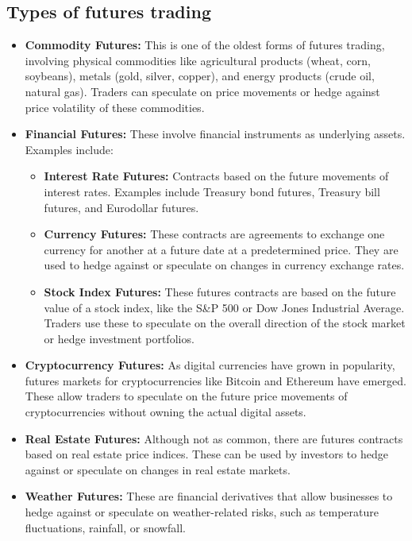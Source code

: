 \documentclass{report}
\begin{document}
    \bigbreak \noindent 
    \subsection{Types of futures trading}
    \bigbreak \noindent 
    \begin{itemize}
        \item \textbf{Commodity Futures:} This is one of the oldest forms of futures trading, involving physical commodities like agricultural products (wheat, corn, soybeans), metals (gold, silver, copper), and energy products (crude oil, natural gas). Traders can speculate on price movements or hedge against price volatility of these commodities.
        \item \textbf{Financial Futures:} These involve financial instruments as underlying assets. Examples include:
            \begin{itemize}
                \item \textbf{Interest Rate Futures:} Contracts based on the future movements of interest rates. Examples include Treasury bond futures, Treasury bill futures, and Eurodollar futures.
                \item \textbf{Currency Futures:} These contracts are agreements to exchange one currency for another at a future date at a predetermined price. They are used to hedge against or speculate on changes in currency exchange rates.
                \item \textbf{Stock Index Futures:} These futures contracts are based on the future value of a stock index, like the S&P 500 or Dow Jones Industrial Average. Traders use these to speculate on the overall direction of the stock market or hedge investment portfolios.
            \end{itemize}
        \item \textbf{Cryptocurrency Futures:} As digital currencies have grown in popularity, futures markets for cryptocurrencies like Bitcoin and Ethereum have emerged. These allow traders to speculate on the future price movements of cryptocurrencies without owning the actual digital assets.
        \item \textbf{Real Estate Futures:} Although not as common, there are futures contracts based on real estate price indices. These can be used by investors to hedge against or speculate on changes in real estate markets.
        \item \textbf{Weather Futures:} These are financial derivatives that allow businesses to hedge against or speculate on weather-related risks, such as temperature fluctuations, rainfall, or snowfall.
    \end{itemize}
    \bigbreak \noindent 
\end{document}
